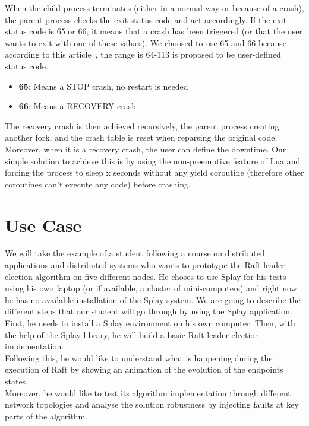 \documentclass{eplmastersthesis}
\begin{document}
        When the child process terminates (either in a normal way or because
        of a crash), the parent process checks the exit status code and act
        accordingly. If the exit status code is 65 or 66, it means that a
        crash has been triggered (or that the user wants to exit
        with one of these values). We choosed to use 65 and 66 because 
        according to this article~\cite{StatusCode}, the range is 64-113 
        is proposed to be user-defined status code.

        \begin{itemize}
          \item \textbf{65}: Means a STOP crash, no restart is needed
          \item \textbf{66}: Means a RECOVERY crash
        \end{itemize}

        The recovery crash is then achieved recursively, the parent process
        creating another fork, and the crash table is reset when reparsing
        the original code. Moreover, when it is a recovery crash, the user
        can define the downtime. Our simple solution to achieve this is by
        using the non-preemptive feature of Lua and forcing the process
        to sleep x seconds without any yield coroutine (therefore other
        coroutines can't execute any code) before crashing.

  \chapter{Use Case}

    We will take the example of a student following a course on distributed
    applications and distributed systems who wants to prototype the Raft
    leader election algorithm on five different nodes. He choses to use
    Splay for his tests using his own laptop (or if available, a cluster
    of mini-computers) and right now he has no available installation of the
    Splay system. We are going to describe the different steps that our
    student will go through by using the Splay application.\\

    First, he needs to install a Splay environment on his own computer. Then,
    with the help of the Splay library, he will build a basic Raft leader
    election implementation.\\
    Following this, he would like to understand what is happening during the
    execution of Raft by showing an animation of the evolution of the
    endpoints states.\\
    Moreover, he would like to test its algorithm implementation through
    different network topologies and analyse the solution
    robustness by injecting faults at key parts of the algorithm.
\end{document}
